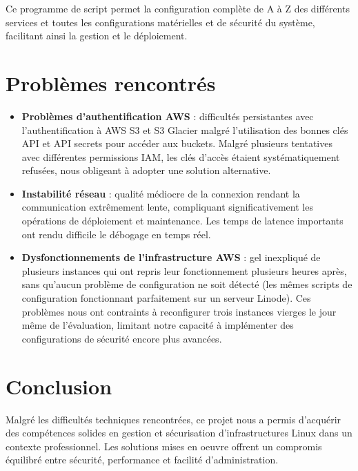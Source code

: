 \documentclass[a4paper,12pt]{article}
\begin{document}
\FloatBarrier

Ce programme de script permet la configuration complète de A à Z des différents services et toutes les configurations matérielles et de sécurité du système, facilitant ainsi la gestion et le déploiement.
\newpage
\section{Problèmes rencontrés}

\begin{itemize}
	\item \textbf{Problèmes d'authentification AWS} : difficultés persistantes avec l'authentification à AWS S3 et S3 Glacier malgré l'utilisation des bonnes clés API et API secrets pour accéder aux buckets. Malgré plusieurs tentatives avec différentes permissions IAM, les clés d'accès étaient systématiquement refusées, nous obligeant à adopter une solution alternative.
	
	\item \textbf{Instabilité réseau} : qualité médiocre de la connexion rendant la communication extrêmement lente, compliquant significativement les opérations de déploiement et maintenance. Les temps de latence importants ont rendu difficile le débogage en temps réel.
	
	\item \textbf{Dysfonctionnements de l'infrastructure AWS} : gel inexpliqué de plusieurs instances qui ont repris leur fonctionnement plusieurs heures après, sans qu'aucun problème de configuration ne soit détecté (les mêmes scripts de configuration fonctionnant parfaitement sur un serveur Linode). Ces problèmes nous ont contraints à reconfigurer trois instances vierges le jour même de l'évaluation, limitant notre capacité à implémenter des configurations de sécurité encore plus avancées.
\end{itemize}

\section{Conclusion}

Malgré les difficultés techniques rencontrées, ce projet nous a permis d'acquérir des compétences solides en gestion et sécurisation d'infrastructures Linux dans un contexte professionnel. Les solutions mises en oeuvre offrent un compromis équilibré entre sécurité, performance et facilité d'administration.
\end{document}

